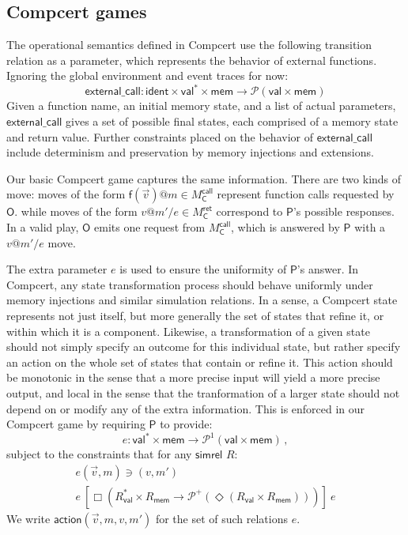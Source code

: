 \documentclass[acmsmall,anonymous]{acmart}
\makeatletter
\newcommand{\kw}[1]{\ensuremath{ \textsf{#1} }}
\newcommand{\ifr}[1]{\ [{#1}]\ }
\newcommand{\EC}{\kw{C}}
\newcommand{\simrel}{\kw{simrel}}
\newcommand{\mcall}[3]{\kw{#1}({#2})@{#3}}
\newcommand{\mretx}[3]{{#1}@{#2}/{#3}}
\makeatother
\begin{document}

\subsection{Compcert games} %

The operational semantics defined in Compcert
use the following transition relation as a parameter,
which represents the behavior of external functions.
Ignoring the global environment and event traces for now:
\[
  \kw{external\_call} :
    \kw{ident} \times \kw{val}^* \times \kw{mem} \rightarrow
    \mathcal{P}(\kw{val} \times \kw{mem})
\]
Given a function name,
an initial memory state,
and a list of actual parameters,
$\kw{external\_call}$ gives a set of possible final states,
each comprised of a memory state and return value.
Further constraints placed on the behavior of
\kw{external\_call} include determinism
and preservation by memory injections and extensions.

Our basic Compcert game
captures the same information.
There are two kinds of move:
moves of the form
$\mcall{f}{\vec{v}}{m} \in M_\EC^\kw{call}$
represent function calls requested by \kw{O}.
while moves of the form
$\mretx{v}{m'}{e} \in M_\EC^\kw{ret}$
correspond to \kw{P}'s possible responses.
In a valid play,
\kw{O} emits one request from $M_\EC^\kw{call}$,
which is answered by \kw{P} with a $\mretx{v}{m'}{e}$ move.

The extra parameter $e$
is used to ensure the uniformity of \kw{P}'s answer.
In Compcert,
any state transformation process should behave uniformly
under memory injections and similar simulation relations.
In a sense,
a Compcert state represents not just itself,
but more generally the set of states that refine it,
or within which it is a component.
Likewise,
a transformation of a given state
should not simply specify an outcome for this individual state,
but rather specify an action on the whole set of states that contain or refine it.
This action should be monotonic
in the sense that a more precise input will yield a more precise output,
and local in the sense that the tranformation of a larger state
should not depend on or modify any of the extra information.
This is enforced in our Compcert game by requiring \kw{P}
to provide:
\[ e : \kw{val}^* \times \kw{mem} \rightarrow \mathcal{P}^1(\kw{val} \times \kw{mem}) \,, \]
subject to the constraints that for any \simrel{} $R$:
\begin{gather*}
  e(\vec{v}, m) \ni (v, m') \\
  e \ifr{\Box (R_\kw{val}^* \times R_\kw{mem} \rightarrow
         \mathcal{P}^+(\Diamond (R_\kw{val} \times R_\kw{mem})))} e
\end{gather*}
We write $\kw{action}(\vec{v}, m, v, m')$
for the set of such relations $e$.
\end{document}

